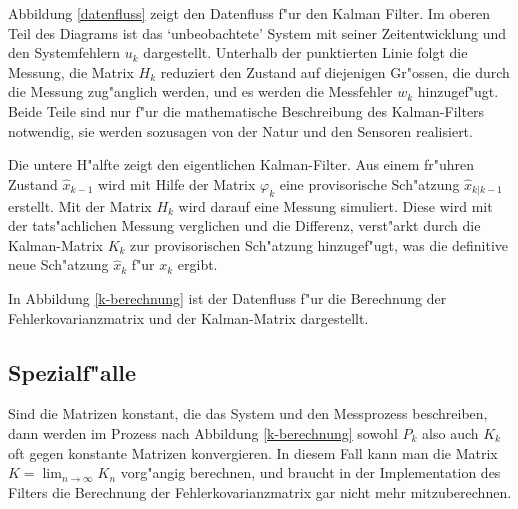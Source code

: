 Abbildung \ref{datenfluss} zeigt den Datenfluss f"ur den Kalman Filter.
Im oberen Teil des Diagrams ist das `unbeobachtete' System mit seiner
Zeitentwicklung und den Systemfehlern $u_k$ dargestellt. Unterhalb der
punktierten Linie folgt die Messung, die Matrix $H_k$ reduziert den Zustand
auf diejenigen Gr"ossen, die durch die Messung zug"anglich werden, und es
werden die Messfehler $w_k$ hinzugef"ugt. Beide Teile sind nur f"ur die
mathematische Beschreibung des Kalman-Filters notwendig, sie werden
sozusagen von der Natur und den Sensoren realisiert.

Die untere H"alfte zeigt den eigentlichen Kalman-Filter.
Aus einem fr"uhren Zustand $\hat x_{k-1}$ wird mit Hilfe der Matrix
$\varphi_k$ eine provisorische Sch"atzung $\hat x_{k|k-1}$ erstellt.
Mit der Matrix $H_k$ wird darauf eine Messung simuliert. Diese wird
mit der tats"achlichen Messung verglichen und die Differenz, verst"arkt durch
die Kalman-Matrix $K_k$ zur provisorischen Sch"atzung hinzugef"ugt, was
die definitive neue Sch"atzung $\hat x_k$ f"ur $x_k$ ergibt.

In Abbildung \ref{k-berechnung} ist der Datenfluss f"ur die Berechnung
der Fehlerkovarianzmatrix und der Kalman-Matrix dargestellt.

\subsection{Spezialf"alle}
Sind die Matrizen konstant, die das System und den Messprozess beschreiben, 
dann werden im Prozess nach Abbildung \ref{k-berechnung} sowohl $P_k$ also auch
$K_k$ oft gegen konstante Matrizen konvergieren. In diesem Fall kann man
die Matrix $K=\lim_{n\to\infty}K_n$ vorg"angig berechnen, und braucht
in der Implementation des Filters die Berechnung der Fehlerkovarianzmatrix
gar nicht mehr mitzuberechnen. 

